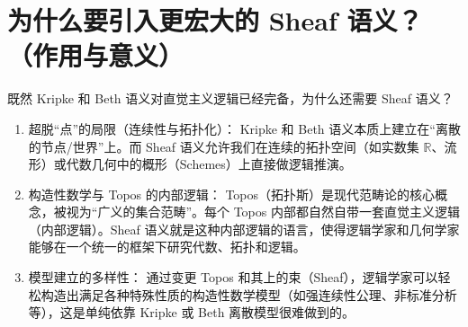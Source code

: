 \documentclass[12pt,a4paper]{article}
\begin{document}
\section{为什么要引入更宏大的 Sheaf 语义？（作用与意义）}

既然 Kripke 和 Beth 语义对直觉主义逻辑已经完备，为什么还需要 Sheaf 语义？

\begin{enumerate}
  \item 超脱“点”的局限（连续性与拓扑化）：
  Kripke 和 Beth 语义本质上建立在“离散的节点/世界”上。而 Sheaf 语义允许我们在连续的拓扑空间（如实数集 $\mathbb{R}$、流形）或代数几何中的概形（Schemes）上直接做逻辑推演。
  
  \item 构造性数学与 Topos 的内部逻辑：
  Topos（拓扑斯）是现代范畴论的核心概念，被视为“广义的集合范畴”。每个 Topos 内部都自然自带一套直觉主义逻辑（内部逻辑）。Sheaf 语义就是这种内部逻辑的语言，使得逻辑学家和几何学家能够在一个统一的框架下研究代数、拓扑和逻辑。
  
  \item 模型建立的多样性：
  通过变更 Topos 和其上的束（Sheaf），逻辑学家可以轻松构造出满足各种特殊性质的构造性数学模型（如强连续性公理、非标准分析等），这是单纯依靠 Kripke 或 Beth 离散模型很难做到的。
\end{enumerate}
\end{document}
